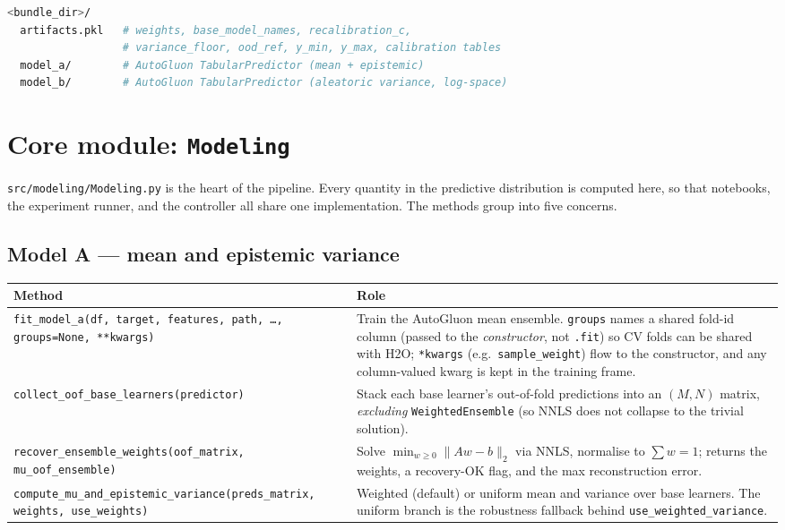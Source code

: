 \documentclass[11pt,a4paper]{article}
\newcommand{\code}[1]{\texttt{\small #1}}
\newcommand{\file}[1]{\texttt{\small #1}}
\begin{document}
\begin{lstlisting}[language=bash,basicstyle=\ttfamily\footnotesize]
<bundle_dir>/
  artifacts.pkl   # weights, base_model_names, recalibration_c,
                  # variance_floor, ood_ref, y_min, y_max, calibration tables
  model_a/        # AutoGluon TabularPredictor (mean + epistemic)
  model_b/        # AutoGluon TabularPredictor (aleatoric variance, log-space)
\end{lstlisting}

\section{Core module: \code{Modeling}}

\file{src/modeling/Modeling.py} is the heart of the pipeline. Every quantity in
the predictive distribution is computed here, so that notebooks, the experiment
runner, and the controller all share one implementation. The methods group into
five concerns.

\subsection{Model A --- mean and epistemic variance}

\begin{longtable}{@{}p{}p{}@{}}
\toprule
\textbf{Method} & \textbf{Role} \\
\midrule
\endhead
\code{fit\_model\_a(df, target, features, path, \dots, groups=None, **kwargs)} &
  Train the AutoGluon mean ensemble. \code{groups} names a shared fold-id column
  (passed to the \emph{constructor}, not \code{.fit}) so CV folds can be shared
  with H2O; \code{**kwargs} (e.g.\ \code{sample\_weight}) flow to the
  constructor, and any column-valued kwarg is kept in the training frame. \\
\code{collect\_oof\_base\_learners(predictor)} &
  Stack each base learner's out-of-fold predictions into an $(M,N)$ matrix,
  \emph{excluding} \code{WeightedEnsemble} (so NNLS does not collapse to the
  trivial solution). \\
\code{recover\_ensemble\_weights(oof\_matrix, mu\_oof\_ensemble)} &
  Solve $\min_{w\ge 0}\lVert A w - b\rVert_2$ via NNLS, normalise to
  $\sum w = 1$; returns the weights, a recovery-OK flag, and the max
  reconstruction error. \\
\code{compute\_mu\_and\_epistemic\_variance(preds\_matrix, weights, use\_weights)} &
  Weighted (default) or uniform mean and variance over base learners. The
  uniform branch is the robustness fallback behind \code{use\_weighted\_variance}. \\
\bottomrule
\end{longtable}
\end{document}
